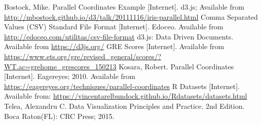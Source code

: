 \documentclass[]{article}
\begin{document}
\begin{thebibliography}{11}
		Bostock, Mike. Parallel Coordinates Example [Internet]. d3.js; Available from \url{http://mbostock.github.io/d3/talk/20111116/iris-parallel.html}
		Comma Separated Values (CSV) Standard File Format [Internet]. Edoceo. Available from \url{http://edoceo.com/utilitas/csv-file-format}
		d3.js: Data Driven Documents. Available from \url{https://d3js.org/}
		GRE Scores [Internet]. Available from \url{https://www.ets.org/gre/revised_general/scores/?WT.ac=grehome_grescores_150213}
		Kosara, Robert. Parallel Coordinates [Internet]. Eagereyes; 2010. Available from \url{https://eagereyes.org/techniques/parallel-coordinates}
		R Datasets [Internet]. Available from: \url{https://vincentarelbundock.github.io/Rdatasets/datasets.html}
		Telea, Alexandru C. Data Visualization Principles and Practice. 2nd Edition. Boca Raton(FL): CRC Press; 2015.


\end{thebibliography}
\end{document}
